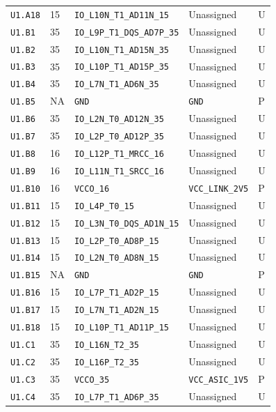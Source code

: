 \documentclass[11pt,a4paper]{article}
\begin{document}
\begin{longtable}{@{}P{20mm}P{10mm}P{70mm}P{51mm}P{11mm}@{}}
\nolinkurl{U1.A18} & 15 & \nolinkurl{IO_L10N_T1_AD11N_15} & Unassigned & U \\
\nolinkurl{U1.B1} & 35 & \nolinkurl{IO_L9P_T1_DQS_AD7P_35} & Unassigned & U \\
\nolinkurl{U1.B2} & 35 & \nolinkurl{IO_L10N_T1_AD15N_35} & Unassigned & U \\
\nolinkurl{U1.B3} & 35 & \nolinkurl{IO_L10P_T1_AD15P_35} & Unassigned & U \\
\nolinkurl{U1.B4} & 35 & \nolinkurl{IO_L7N_T1_AD6N_35} & Unassigned & U \\
\nolinkurl{U1.B5} & NA & \nolinkurl{GND} & \nolinkurl{GND} & P \\
\nolinkurl{U1.B6} & 35 & \nolinkurl{IO_L2N_T0_AD12N_35} & Unassigned & U \\
\nolinkurl{U1.B7} & 35 & \nolinkurl{IO_L2P_T0_AD12P_35} & Unassigned & U \\
\nolinkurl{U1.B8} & 16 & \nolinkurl{IO_L12P_T1_MRCC_16} & Unassigned & U \\
\nolinkurl{U1.B9} & 16 & \nolinkurl{IO_L11N_T1_SRCC_16} & Unassigned & U \\
\nolinkurl{U1.B10} & 16 & \nolinkurl{VCCO_16} & \nolinkurl{VCC_LINK_2V5} & P \\
\nolinkurl{U1.B11} & 15 & \nolinkurl{IO_L4P_T0_15} & Unassigned & U \\
\nolinkurl{U1.B12} & 15 & \nolinkurl{IO_L3N_T0_DQS_AD1N_15} & Unassigned & U \\
\nolinkurl{U1.B13} & 15 & \nolinkurl{IO_L2P_T0_AD8P_15} & Unassigned & U \\
\nolinkurl{U1.B14} & 15 & \nolinkurl{IO_L2N_T0_AD8N_15} & Unassigned & U \\
\nolinkurl{U1.B15} & NA & \nolinkurl{GND} & \nolinkurl{GND} & P \\
\nolinkurl{U1.B16} & 15 & \nolinkurl{IO_L7P_T1_AD2P_15} & Unassigned & U \\
\nolinkurl{U1.B17} & 15 & \nolinkurl{IO_L7N_T1_AD2N_15} & Unassigned & U \\
\nolinkurl{U1.B18} & 15 & \nolinkurl{IO_L10P_T1_AD11P_15} & Unassigned & U \\
\nolinkurl{U1.C1} & 35 & \nolinkurl{IO_L16N_T2_35} & Unassigned & U \\
\nolinkurl{U1.C2} & 35 & \nolinkurl{IO_L16P_T2_35} & Unassigned & U \\
\nolinkurl{U1.C3} & 35 & \nolinkurl{VCCO_35} & \nolinkurl{VCC_ASIC_1V5} & P \\
\nolinkurl{U1.C4} & 35 & \nolinkurl{IO_L7P_T1_AD6P_35} & Unassigned & U \\

\end{longtable}
\end{document}
